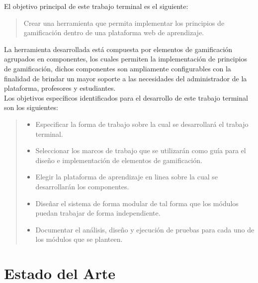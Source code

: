  \noindent El objetivo principal de este trabajo terminal es el siguiente:

    \begin{quote}\hspace{0.135\linewidth}
    \colorbox{blue!05}{\parbox{\dimexpr0.73\linewidth}{\strut
        Crear una herramienta que permita implementar los principios
        de gamificación dentro de una plataforma web de aprendizaje.
    \strut}}
    \end{quote}

 \noindent La herramienta desarrollada está compuesta por elementos de gamificación
 agrupados en componentes, los cuales permiten la implementación de principios de
 gamificación, dichos componentes son ampliamente configurables con la finalidad
 de brindar un mayor soporte a las necesidades del administrador de la plataforma,
 profesores y estudiantes.\\

 Los objetivos específicos identificados para el desarrollo de este trabajo terminal
 son los siguientes:

    \begin{quote}
    \begin{itemize}%
    \item Especificar la forma de trabajo sobre la cual se desarrollará el
          trabajo terminal.

    \item Seleccionar los marcos de trabajo que se utilizarán como guía para
          el diseño e implementación de elementos de gamificación.

    \item Elegir la plataforma de aprendizaje en linea sobre la cual se
          desarrollarán los componentes.

    \item Diseñar el sistema de forma modular de tal forma que los módulos
          puedan trabajar de forma independiente.

    \item Documentar el análisis, diseño y ejecución de pruebas para cada
          uno de los módulos que se planteen.
    \end{itemize}
    \end{quote}

\section{Estado del Arte} \label{sec:estadoArte}

